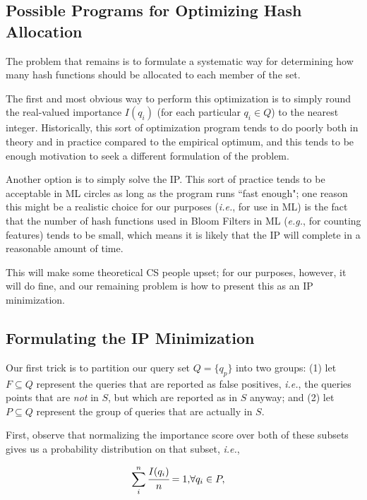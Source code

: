 \documentclass[11pt]{article}
\begin{document}
\subsection{Possible Programs for Optimizing Hash Allocation}

The problem that remains is to formulate a systematic way for determining how many hash functions should be allocated to each member of the set.

The first and most obvious way to perform this optimization is to simply round the real-valued importance $I(q_i)$ (for each particular $q_i \in Q$) to the nearest integer. Historically, this sort of optimization program tends to do poorly both in theory and in practice compared to the empirical optimum, and this tends to be enough motivation to seek a different formulation of the problem.

Another option is to simply solve the IP. This sort of practice tends to be acceptable in ML circles as long as the program runs ``fast enough"; one reason this might be a realistic choice for our purposes (\textit{i.e.}, for use in ML) is the fact that the number of hash functions used in Bloom Filters in ML (\textit{e.g.}, for counting features) tends to be small, which means it is likely that the IP will complete in a reasonable amount of time.

This will make some theoretical CS people upset; for our purposes, however, it will do fine, and our remaining problem is how to present this as an IP minimization.

\subsection{Formulating the IP Minimization}

Our first trick is to partition our query set $Q = \{ q_p \}$ into two groups: (1) let $F \subseteq Q$ represent the queries that are reported as false positives, \textit{i.e.}, the queries points that are \textit{not} in $S$, but which are reported as in $S$ anyway; and (2) let $P \subseteq Q$ represent the group of queries that are actually in $S$.

First, observe that normalizing the importance score over both of these subsets gives us a probability distribution on that subset, \textit{i.e.},

\begin{eqnarray}
\sum_i^n \cfrac{I(q_i)}{n} = 1, & \forall q_i \in P,
\end{eqnarray}
\end{document}
